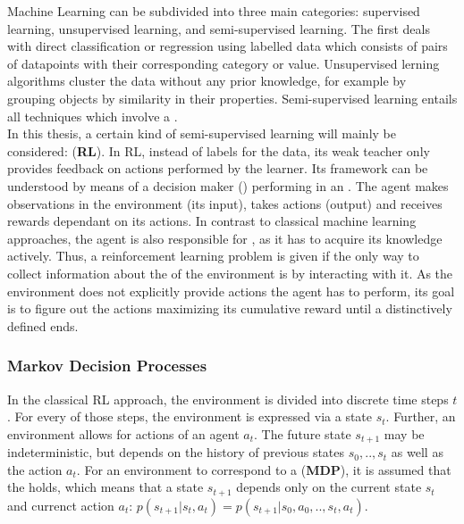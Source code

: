 Machine Learning can be subdivided into three main categories: supervised learning, unsupervised learning, and semi-supervised learning. The first deals with direct classification or regression using labelled data which consists of pairs of datapoints with their corresponding category or value. Unsupervised lerning algorithms cluster the data without any prior knowledge, for example by grouping objects by similarity in their properties. Semi-supervised learning entails all techniques which involve a .\\
In this thesis, a certain kind of semi-supervised learning will mainly be considered:  (\textbf{RL}). In RL, instead of labels for the data, its weak teacher only provides feedback on actions performed by the learner. Its framework can be understood by means of a decision maker () performing in an . The agent makes observations in the environment (its input), takes actions (output) and receives rewards dependant on its actions. In contrast to classical machine learning approaches, the agent is also responsible for , as it has to acquire its knowledge actively. Thus, a reinforcement learning problem is given if the only way to collect information about the  of the environment is by interacting with it. As the environment does not explicitly provide actions the agent has to perform, its goal is to figure out the actions maximizing its cumulative reward until a distinctively defined  ends.

\subsubsection{Markov Decision Processes} \label{ch:mdps}

In the classical RL approach, the environment is divided into discrete time steps $t$. For every of those steps, the environment is expressed via a state $s_t$. Further, an environment allows for actions of an agent $a_t$. The future state $s_{t+1}$ may be indeterministic, but depends on the history of previous states $s_0, .., s_t$ as well as the action $a_t$. For an environment to correspond to a  (\textbf{MDP}), it is assumed that the  holds, which means that  a state  $s_{t+1}$ depends only on the current state $s_t$ and currenct action $a_t$: $p(s_{t+1}|s_t,a_t) = p(s_{t+1}|s_0,a_0,..,s_t,a_t)$.

